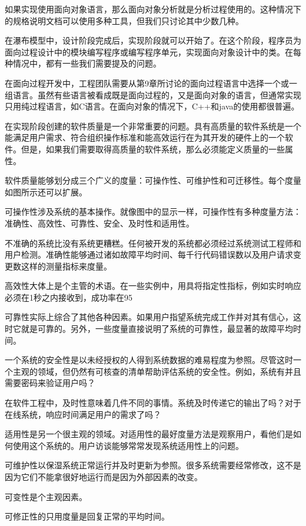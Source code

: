 如果实现使用面向对象语言，那么面向对象分析就是分析过程使用的。这种情况下的规格说明文档可以使用多种工具，但我们只讨论其中少数几种。

在瀑布模型中，设计阶段完成后，实现阶段就可以开始了。在这个阶段，程序员为面向过程设计中的模块编写程序或编写程序单元，实现面向对象设计中的类。在每种情况中，都有一些我们需要提及的问题。

在面向过程开发中，工程团队需要从第9章所讨论的面向过程语言中选择一个或一组语言。虽然有些语言被看成既是面向过程的，又是面向对象的语言，但通常实现只用纯过程语言，如C语言。在面向对象的情况下，C++和java的使用都很普遍。

在实现阶段创建的软件质量是一个非常重要的问题。具有高质量的软件系统是一个能满足用户需求、符合组织操作标准和能高效运行在为其开发的硬件上的一个软件。但是，如果我们需要取得高质量的软件系统，那么必须能定义质量的一些属性。

软件质量能够划分成三个广义的度量：可操作性、可维护性和可迁移性。每个度量如图所示还可以扩展。

可操作性涉及系统的基本操作。就像图中的显示一样，可操作性有多种度量方法：准确性、高效性、可靠性、安全、及时性和适用性。

不准确的系统比没有系统更糟糕。任何被开发的系统都必须经过系统测试工程师和用户检测。准确性能够通过诸如故障平均时间、每千行代码错误数以及用户请求变更数这样的测量指标来度量。

高效性大体上是个主管的术语。在一些实例中，用具将指定性指标，例如实时响应必须在1秒之内接收到，成功率在95%

可靠性实际上综合了其他各种因素。如果用户指望系统完成工作并对其有信心，这时它就是可靠的。另外，一些度量直接说明了系统的可靠性，最显著的故障平均时间。

一个系统的安全性是以未经授权的人得到系统数据的难易程度为参照。尽管这时一个主观的领域，但仍然有可核查的清单帮助评估系统的安全性。例如，系统有并且需要密码来验证用户吗？

在软件工程中，及时性意味着几件不同的事情。系统及时传递它的输出了吗？对于在线系统，响应时间满足用户的需求了吗？

适用性是另一个很主观的领域。对适用性的最好度量方法是观察用户，看他们是如何使用这个系统的。用户访谈能够常常发现系统适用性上的问题。

可维护性以保湿系统正常运行并及时更新为参照。很多系统需要经常修改，这不是因为它们不能拿很好地运行而是因为外部因素的改变。

可变性是个主观因素。

可修正性的只用度量是回复正常的平均时间。

